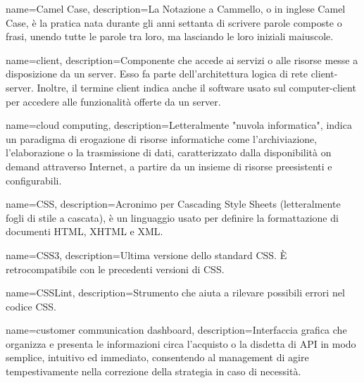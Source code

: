 \hypertarget{C}{}

{
	name=Camel Case,
	description={La Notazione a Cammello, o in inglese Camel Case, è la pratica nata durante gli anni settanta di scrivere parole composte o frasi, unendo tutte le parole tra loro, ma lasciando le loro iniziali maiuscole.}
}

{
	name=client,
	description={Componente che accede ai servizi o alle risorse messe a disposizione da un server. Esso fa parte dell'architettura logica di rete client-server. Inoltre, il termine client indica anche il software usato sul computer-client per accedere alle funzionalità offerte da un server.}
}

{
	name=cloud computing,
	description={Letteralmente "nuvola informatica", indica un paradigma di erogazione di risorse informatiche come l'archiviazione, l'elaborazione o la trasmissione di dati, caratterizzato dalla disponibilità on demand attraverso Internet, a partire da un insieme di risorse preesistenti e configurabili.}
}

{
	name=CSS,
	description={Acronimo per Cascading Style Sheets (letteralmente fogli di stile a cascata), è un linguaggio usato per definire la formattazione di documenti HTML, XHTML e XML.}
}

{
	name=CSS3,
	description={Ultima versione dello standard CSS. \MakeUppercase{è} retrocompatibile con le precedenti versioni di CSS.}
}

{
	name=CSSLint,
	description={Strumento che aiuta a rilevare possibili errori nel codice CSS.}
}

{
	name=customer communication dashboard,
	description={Interfaccia grafica che organizza e presenta le informazioni circa l'acquisto o la disdetta di API in modo semplice, intuitivo ed immediato, consentendo al management di agire tempestivamente nella correzione della strategia in caso di necessità.}
}



	
